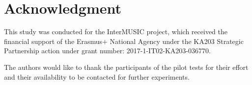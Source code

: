 
\section*{Acknowledgment}
This study was conducted for the InterMUSIC project,
which received the financial support of the Erasmus+ National Agency under the KA203 Strategic Partnership action under grant number: 2017-1-IT02-KA203-036770.

The authors would like to thank the participants of the  pilot tests for their effort and their availability to be contacted for further experiments. 